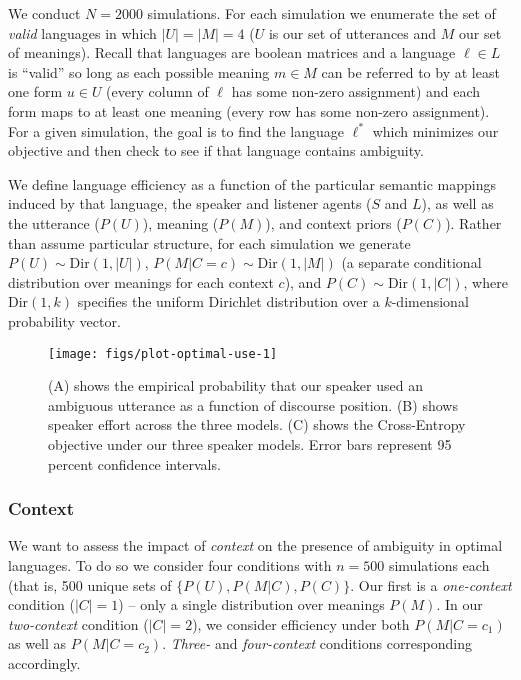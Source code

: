 \documentclass[10pt, letterpaper]{article}
\newenvironment{CodeChunk}{}{}
\begin{document}
We conduct \(N=2000\) simulations. For each simulation we enumerate the
set of \emph{valid} languages in which \(|U|=|M|=4\) (\(U\) is our set
of utterances and \(M\) our set of meanings). Recall that languages are
boolean matrices and a language \(\ell \in L\) is ``valid'' so long as
each possible meaning \(m \in M\) can be referred to by at least one
form \(u \in U\) (every column of \(\ell\) has some non-zero assignment)
and each form maps to at least one meaning (every row has some non-zero
assignment). For a given simulation, the goal is to find the language
\(\ell^*\) which minimizes our objective and then check to see if that
language contains ambiguity.\par

We define language efficiency as a function of the particular semantic
mappings induced by that language, the speaker and listener agents
(\(S\) and \(L\)), as well as the utterance (\(P(U)\)), meaning
(\(P(M)\)), and context priors (\(P(C)\)). Rather than assume particular
structure, for each simulation we generate
\(P(U) \sim \text{Dir}(1, |U|)\), \(P(M|C=c) \sim \text{Dir}(1, |M|)\)
(a separate conditional distribution over meanings for each context
\(c\)), and \(P(C) \sim \text{Dir}(1, |C|)\), where \(\text{Dir}(1, k)\)
specifies the uniform Dirichlet distribution over a \(k\)-dimensional
probability vector.\par

\begin{CodeChunk}
\begin{figure*}[h]

{\centering \texttt{[image: figs/plot-optimal-use-1]} 

}

\caption[(A) shows the empirical probability that our speaker used an ambiguous utterance as a function of discourse position]{(A) shows the empirical probability that our speaker used an ambiguous utterance as a function of discourse position. (B) shows speaker effort across the three models. (C) shows the Cross-Entropy objective under our three speaker models. Error bars represent 95 percent confidence intervals.}\label{fig:plot-optimal-use}
\end{figure*}
\end{CodeChunk}

\subsubsection{Context}\label{context}

We want to assess the impact of \emph{context} on the presence of
ambiguity in optimal languages. To do so we consider four conditions
with \(n=500\) simulations each (that is, 500 unique sets of
\(\{P(U), P(M|C), P(C)\}\). Our first is a \textit{one-context}
condition (\(|C|=1\)) -- only a single distribution over meanings
\(P(M)\). In our \textit{two-context} condition (\(|C| = 2\)), we
consider efficiency under both \(P(M|C=c_1)\) as well as \(P(M|C=c_2)\).
\textit{Three-} and \textit{four-context} conditions corresponding
accordingly.\par
\end{document}
